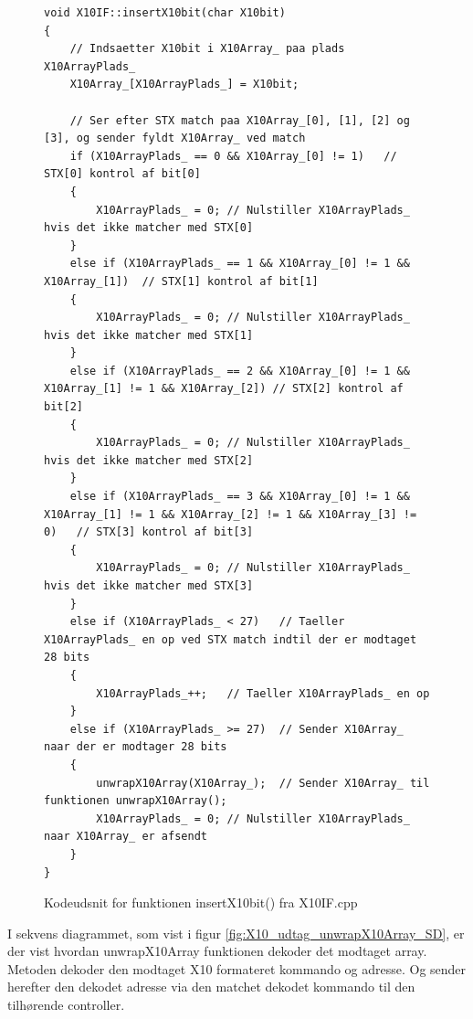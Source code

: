 \begin{figure}[!htb]
\lstset{language=C++}
\begin{lstlisting}
void X10IF::insertX10bit(char X10bit)
{
	// Indsaetter X10bit i X10Array_ paa plads X10ArrayPlads_
	X10Array_[X10ArrayPlads_] = X10bit;
	
	// Ser efter STX match paa X10Array_[0], [1], [2] og [3], og sender fyldt X10Array_ ved match 
	if (X10ArrayPlads_ == 0 && X10Array_[0] != 1)	// STX[0] kontrol af bit[0]
	{
		X10ArrayPlads_ = 0;	// Nulstiller X10ArrayPlads_ hvis det ikke matcher med STX[0]
	}	
	else if (X10ArrayPlads_ == 1 && X10Array_[0] != 1 && X10Array_[1])	// STX[1] kontrol af bit[1]
	{
		X10ArrayPlads_ = 0;	// Nulstiller X10ArrayPlads_ hvis det ikke matcher med STX[1]
	}	
	else if (X10ArrayPlads_ == 2 && X10Array_[0] != 1 && X10Array_[1] != 1 && X10Array_[2])	// STX[2] kontrol af bit[2]
	{
		X10ArrayPlads_ = 0;	// Nulstiller X10ArrayPlads_ hvis det ikke matcher med STX[2]
	}
	else if (X10ArrayPlads_ == 3 && X10Array_[0] != 1 && X10Array_[1] != 1 && X10Array_[2] != 1 && X10Array_[3] != 0)	// STX[3] kontrol af bit[3]
	{
		X10ArrayPlads_ = 0;	// Nulstiller X10ArrayPlads_ hvis det ikke matcher med STX[3]
	}
	else if (X10ArrayPlads_ < 27)	// Taeller X10ArrayPlads_ en op ved STX match indtil der er modtaget 28 bits
	{
		X10ArrayPlads_++;	// Taeller X10ArrayPlads_ en op 
	}	
	else if (X10ArrayPlads_ >= 27)	// Sender X10Array_ naar der er modtager 28 bits
	{
		unwrapX10Array(X10Array_);	// Sender X10Array_ til funktionen unwrapX10Array();
		X10ArrayPlads_ = 0;	// Nulstiller X10ArrayPlads_ naar X10Array_ er afsendt
	}
}
\end{lstlisting}
\caption{Kodeudsnit for funktionen insertX10bit() fra X10IF.cpp}
\label{fig:X10IF_insertX10bit}
\end{figure}

I sekvens diagrammet, som vist i figur \ref{fig:X10_udtag_unwrapX10Array_SD}, er der vist hvordan unwrapX10Array funktionen dekoder det modtaget array. Metoden dekoder den modtaget X10 formateret kommando og adresse. Og sender herefter den dekodet adresse via den matchet dekodet kommando til den tilhørende controller.


